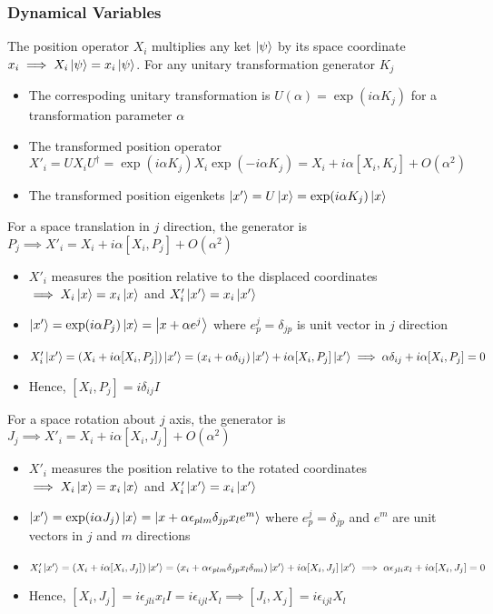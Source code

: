 \documentclass[8pt,t,mathserif,aspectratio=169]{beamer}
\begin{document}
\begin{frame}
  \frametitle{Dynamical Variables}
  \vspace{1mm}
  The position operator $X_i$ multiplies any ket $\ket{\psi}$ by its space coordinate $x_i \implies X_i \ket{\psi} = x_i \ket{\psi}$. For any unitary transformation generator $K_j$
  \begin{itemize}
    \item The correspoding unitary transformation is $U(\alpha) = \exp(i \alpha K_j)$ for a transformation parameter $\alpha$
    \item The transformed position operator $X'_i = U X_i U^{\dagger} = \exp(i \alpha K_j) X_i \exp(-i \alpha K_j) = X_i + i \alpha [X_i,K_j] + O(\alpha^2)$
    \item The transformed position eigenkets $\ket{x'} = U \ket{x} = \exp(i \alpha K_j) \ket{x}$
  \end{itemize}
  For a space translation in $j$ direction, the generator is $P_j \implies X'_i = X_i + i \alpha [X_i,P_j] + O(\alpha^2)$
  \begin{itemize}
    \item $X'_i$ measures the position relative to the displaced coordinates $\implies X_i \ket{x} = x_i \ket{x}$ and $X'_i \ket{x'} = x_i \ket{x'}$
    \item $\ket{x'} = \exp(i \alpha P_j) \ket{x} = \ket{x + \alpha e^j}$ where $e^j_p = \delta_{jp}$ is unit vector in $j$ direction
    \item $X'_i \ket{x'} = (X_i + i \alpha [X_i,P_j])\ket{x'} = (x_i + \alpha \delta_{ij})\ket{x'} + i \alpha [X_i,P_j] \ket{x'} \implies \alpha \delta_{ij} + i \alpha [X_i,P_j] = 0$
    \item Hence, $[X_i,P_j] = i \delta_{ij} I$
  \end{itemize}
  For a space rotation about $j$ axis, the generator is $J_j \implies X'_i = X_i + i \alpha [X_i,J_j] + O(\alpha^2)$
  \begin{itemize}
    \item $X'_i$ measures the position relative to the rotated coordinates $\implies X_i \ket{x} = x_i \ket{x}$ and $X'_i \ket{x'} = x_i \ket{x'}$
    \item $\ket{x'} = \exp(i \alpha J_j) \ket{x} = \ket{x + \alpha \epsilon_{plm} \delta_{jp} x_l e^m}$ where $e^j_p = \delta_{jp}$ and $e^m$ are unit vectors in $j$ and $m$ directions
    \item $X'_i \ket{x'} = (X_i + i \alpha [X_i,J_j])\ket{x'} = (x_i + \alpha \epsilon_{plm} \delta_{jp} x_l \delta_{mi})\ket{x'} + i \alpha [X_i,J_j] \ket{x'} \implies \alpha \epsilon_{jli} x_l + i \alpha [X_i,J_j] = 0$
    \item Hence, $[X_i,J_j] = i \epsilon_{jli} x_l I = i \epsilon_{ijl} X_l \implies [J_i,X_j] = i \epsilon_{ijl} X_l$
  \end{itemize}
\end{frame}
\end{document}
